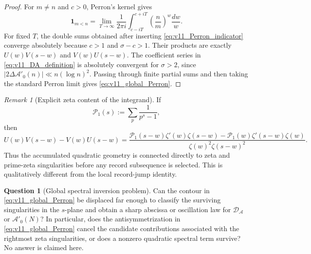 \documentclass[11pt]{amsart}
\numberwithin{equation}{section}
\theoremstyle{plain}
\theoremstyle{definition}
\newtheorem{question}[theorem]{Question}
\theoremstyle{remark}
\newtheorem{remark}[theorem]{Remark}
\begin{document}
\begin{proof}
For \(m\ne n\) and \(c>0\), Perron's kernel gives
\begin{equation}
\mathbf 1_{m<n}
=\lim_{T\to\infty}\frac1{2\pi i}
\int_{c-iT}^{c+iT}\left(\frac{n}{m}\right)^w\frac{dw}{w}.
\label{eq:v11_Perron_indicator}
\end{equation}
For fixed \(T\), the double sums obtained after inserting
\eqref{eq:v11_Perron_indicator} converge absolutely because
\(c>1\) and \(\sigma-c>1\).  Their products are exactly
\(U(w)V(s-w)\) and \(V(w)U(s-w)\).  The coefficient series in
\eqref{eq:v11_DA_definition} is absolutely convergent for \(\sigma>2\), since
\(|2\Delta\mathcal A'_0(n)|\ll n(\log n)^2\).  Passing through finite
partial sums and then taking the standard Perron limit gives
\eqref{eq:v11_global_Perron}.
\end{proof}

\begin{remark}[Explicit zeta content of the integrand]
\label{rem:v11_global_Perron_zeta_content}
If
\begin{equation}
\mathcal P_1(s):=\sum_p\frac1{p^s-1},
\label{eq:v11_P1}
\end{equation}
then
\begin{equation}
U(w)V(s-w)-V(w)U(s-w)
=
\frac{
\mathcal P_1(s-w)\zeta'(w)\zeta(s-w)
-\mathcal P_1(w)\zeta'(s-w)\zeta(w)
}{\zeta(w)^2\zeta(s-w)^2}.
\label{eq:v11_integrand_zeta_form}
\end{equation}
Thus the accumulated quadratic geometry is connected directly to zeta and
prime-zeta singularities before any record subsequence is selected.  This is
qualitatively different from the local record-jump identity.
\end{remark}

\begin{question}[Global spectral inversion problem]
\label{q:v11_global_spectral_inversion}
Can the contour in \eqref{eq:v11_global_Perron} be displaced far enough to
classify the surviving singularities in the \(s\)-plane and obtain a sharp
abscissa or oscillation law for \(\mathscr D_{\mathcal A}\) or
\(\mathcal A'_0(N)\)?  In particular, does the antisymmetrization in
\eqref{eq:v11_global_Perron} cancel the candidate contributions associated
with the rightmost zeta singularities, or does a nonzero quadratic spectral
term survive?  No answer is claimed here.
\end{question}
\end{document}
